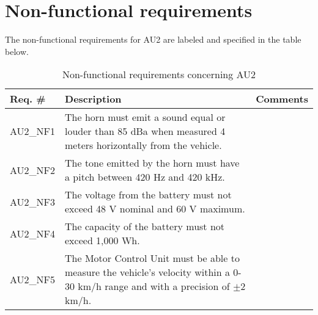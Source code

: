 \section{Non-functional requirements}
The non-functional requirements for AU2 are labeled and specified in the table below.

\begin{table}[h!]
	\centering
	\label{my-label}
	\begin{tabular}{|p{2 cm}|p{7 cm}|p{4 cm}|}
		\hline
		\textbf{Req. \#} & \textbf{Description} & \textbf{Comments} \\\hline
		AU2\_NF1	& The horn must emit a sound equal or louder than 85 dBa when measured 4 meters horizontally from the vehicle. &	\\\hline
		AU2\_NF2	& The tone emitted by the horn must have a pitch between 420 Hz and 420 kHz. &	\\\hline
		AU2\_NF3	& The voltage from the battery must not exceed 48 V nominal and 60 V maximum. &	\\\hline
		AU2\_NF4	& The capacity of the battery must not exceed 1,000 Wh. &	\\\hline
		AU2\_NF5	& The Motor Control Unit must be able to measure the vehicle's velocity within a 0-30 km/h range and with a precision of $\pm$2 km/h. &	\\\hline
	\end{tabular}
	\caption{Non-functional requirements concerning AU2}
\end{table}

